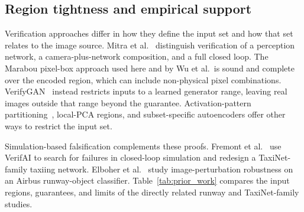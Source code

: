 \documentclass[twocolumn,smallextended,runningheads]{svjour3}
\begin{document}
\subsection{Region tightness and empirical support}

Verification approaches differ in how they define the input set and how that set relates to the image source. Mitra et al.~\cite{mitra2024visionsurvey} distinguish verification of a perception network, a camera-plus-network composition, and a full closed loop. The Marabou pixel-box approach used here and by Wu et al.\ is sound and complete over the encoded region, which can include non-physical pixel combinations. VerifyGAN~\cite{katz2022} instead restricts inputs to a learned generator range, leaving real images outside that range beyond the guarantee. Activation-pattern partitioning~\cite{kadron2021}, local-PCA regions, and subset-specific autoencoders offer other ways to restrict the input set.

Simulation-based falsification complements these proofs. Fremont et al.~\cite{fremont2020} use VerifAI to search for failures in closed-loop simulation and redesign a TaxiNet-family taxiing network. Elboher et al.~\cite{elboher2024runway} study image-perturbation robustness on an Airbus runway-object classifier. Table~\ref{tab:prior_work} compares the input regions, guarantees, and limits of the directly related runway and TaxiNet-family studies.
\end{document}
